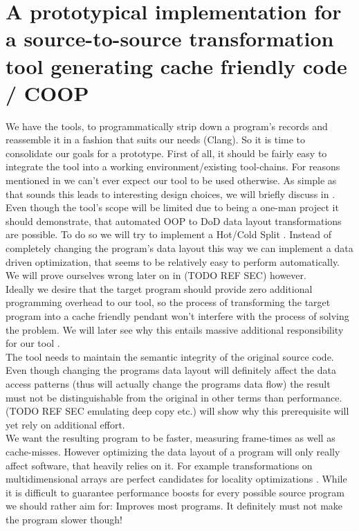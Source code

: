 \chapter{A prototypical implementation for a source-to-source transformation tool generating cache friendly code / COOP}\label{prototype}
We have the tools, to programmatically strip down a program's records and reassemble it in a fashion that suits our needs (Clang). So it is time to consolidate our goals for a prototype. First of all, it should be fairly easy to integrate the tool into a working environment/existing tool-chains. For reasons mentioned in  we can't ever expect our tool to be used otherwise. As simple as that sounds this leads to interesting design choices, we will briefly discuss in .\\
Even though the tool's scope will be limited due to being a one-man project it should demonstrate, that automated OOP to DoD data layout transformations are possible. To do so we will try to implement a Hot/Cold Split . Instead of completely changing the program's data layout this way we can implement a data driven optimization, that seems to be relatively easy to perform automatically. We will prove ourselves wrong later on in (TODO REF SEC) however.\\
Ideally we desire that the target program should provide zero additional programming overhead to our tool, so the process of transforming the target program into a cache friendly pendant won't interfere with the process of solving the problem. We will later see why this entails massive additional responsibility for our tool .\\
The tool needs to maintain the semantic integrity of the original source code. Even though changing the programs data layout will definitely affect the data access patterns (thus will actually change the programs data flow) the result must not be distinguishable from the original in other terms than performance. (TODO REF SEC emulating deep copy etc.) will show why this prerequisite will yet rely on additional effort.\\
We want the resulting program to be faster, measuring frame-times as well as cache-misses. However optimizing the data layout of a program will only really affect software, that heavily relies on it. For example transformations on multidimensional arrays are perfect candidates for locality optimizations . While it is difficult to guarantee performance boosts for every possible source program we should rather aim for: Improves most programs. It definitely must not make the program slower though! 
\newpage
